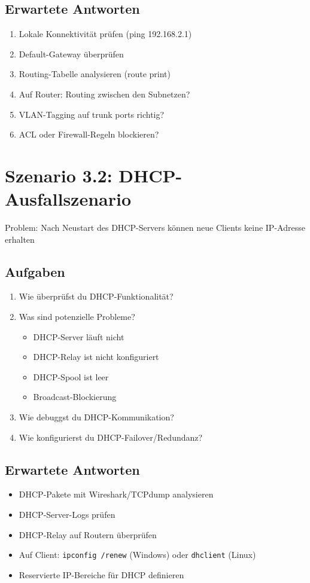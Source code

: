 \documentclass[12pt,a4paper,german]{report}
\begin{document}
\subsection{Erwartete Antworten}
\begin{enumerate}
    \item Lokale Konnektivität prüfen (ping 192.168.2.1)
    \item Default-Gateway überprüfen
    \item Routing-Tabelle analysieren (route print)
    \item Auf Router: Routing zwischen den Subnetzen?
    \item VLAN-Tagging auf trunk ports richtig?
    \item ACL oder Firewall-Regeln blockieren?
\end{enumerate}

\section{Szenario 3.2: DHCP-Ausfallszenario}

Problem: Nach Neustart des DHCP-Servers können neue Clients keine IP-Adresse erhalten

\subsection{Aufgaben}
\begin{enumerate}
    \item Wie überprüfst du DHCP-Funktionalität?
    \item Was sind potenzielle Probleme?
    \begin{itemize}
        \item DHCP-Server läuft nicht
        \item DHCP-Relay ist nicht konfiguriert
        \item DHCP-Spool ist leer
        \item Broadcast-Blockierung
    \end{itemize}
    \item Wie debuggst du DHCP-Kommunikation?
    \item Wie konfigurierst du DHCP-Failover/Redundanz?
\end{enumerate}

\subsection{Erwartete Antworten}
\begin{itemize}
    \item DHCP-Pakete mit Wireshark/TCPdump analysieren
    \item DHCP-Server-Logs prüfen
    \item DHCP-Relay auf Routern überprüfen
    \item Auf Client: \texttt{ipconfig /renew} (Windows) oder \texttt{dhclient} (Linux)
    \item Reservierte IP-Bereiche für DHCP definieren
\end{itemize}
\end{document}
